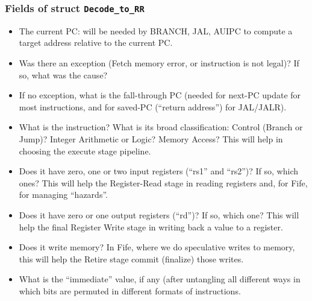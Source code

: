 \begin{frame}
\frametitle{Fields of struct {\tt Decode\_to\_RR}}

\footnotesize

\begin{itemize}

 \item The current PC: will be needed by BRANCH, JAL, AUIPC to compute
       a target address relative to the current PC.

 \PAUSE{\vspace{1ex}}

 \item Was there an exception (Fetch memory error, or instruction is not legal)?
       If so, what was the cause?

 \PAUSE{\vspace{1ex}}

 \item If no exception, what is the fall-through PC (needed for
       next-PC update for most instructions, and for saved-PC
       (``return address'') for JAL/JALR).

 \PAUSE{\vspace{1ex}}

 \item What is the instruction?  What is its broad classification:
       Control (Branch or Jump)? Integer Arithmetic or Logic? Memory
       Access?  This will help in choosing the execute stage pipeline.

 \PAUSE{\vspace{1ex}}

 \item Does it have zero, one or two input registers (``rs1'' and
       ``rs2'')?  If so, which ones?  This will help the Register-Read
       stage in reading registers and, for Fife, for managing ``hazards''.

 \PAUSE{\vspace{1ex}}

 \item Does it have zero or one output registers (``rd'')?  If so,
       which one?  This will help the final Register Write stage in
       writing back a value to a register.

 \PAUSE{\vspace{1ex}}

 \item Does it write memory?  In Fife, where we do speculative writes
       to memory, this will help the Retire stage commit (finalize)
       those writes.

 \PAUSE{\vspace{1ex}}

 \item What is the ``immediate'' value, if any (after untangling all
       different ways in which bits are permuted in different formats of
       instructions.

\end{itemize}

\end{frame}

